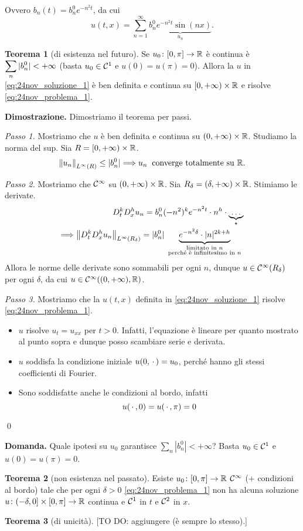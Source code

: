 Ovvero $b_n(t) = b_n^0 e^{-n^2 t}$, da cui  
\begin{equation}
\label{eq:24nov_soluzione_1} \tag{$\ast$}
	u(t,x) = \sum_{n=1}^\infty \underbrace{b_n^0 e^{-n^2t} \sin(nx)}_{u_n}.
\end{equation}


\textbf{Teorema 1} (di esistenza nel futuro).
Se $u_0 \colon [0,\pi] \to \mathbb R$ è continua è $\displaystyle \sum_n |b_n^0| < +\infty$ (basta $u_0 \in \mathcal{C}^1$ e $u(0) = u(\pi) = 0$).
Allora la $u$ in \eqref{eq:24nov_soluzione_1} è ben definita e continua su $[0,+\infty) \times \mathbb R$ e risolve \eqref{eq:24nov_problema_1}.

\textbf{Dimostrazione.} Dimostriamo il teorema per passi.

\textit{Passo 1.}
Mostriamo che $u$ è ben definita e continua su $(0,+\infty) \times \mathbb R$.
Studiamo la norma del sup. Sia $R = [0, +\infty) \times \mathbb R$.
%
$$
	\left\lVert u_n \right\rVert_{L^\infty(R)} \leq |b_n^0| \Longrightarrow u_n \;\; \text{converge totalmente su } \mathbb R.
$$
%

\textit{Passo 2.} Mostriamo che $\mathcal{C}^\infty$ su $(0,+\infty) \times \mathbb R$.
Sia $R_\delta = (\delta, +\infty) \times \mathbb R$.
Stimiamo le derivate.
\begin{align*}
	D_t^k D_x^h u_n = b_n^0 (-n^2)^k e^{-n^2t} \cdot n^h \cdot \underbrace{\ldots}_{\star} \\
	\Longrightarrow \left\lVert D_t^k D_x^h u_n \right\rVert_{L^\infty(R_\delta)} 
	= |b_n^0| \underbrace{e^{-n^2\delta} \cdot |n|^{2k+h}}_{\substack{\text{limitato in $n$} \\ \text{ perché è infinitesimo in $n$ }}}
\end{align*}
Allora le norme delle derivate sono sommabili per ogni $n$, dunque $u \in \mathcal{C}^\infty(R_\delta)$ per ogni $\delta$, da cui $u \in \mathcal{C}^\infty( (0,+\infty),\mathbb R)$.

\textit{Passo 3.} Mostriamo che la $u(t,x)$ definita in \eqref{eq:24nov_soluzione_1} risolve \eqref{eq:24nov_problema_1}.
\begin{itemize}

	\item $u$ risolve $u_t = u_{xx}$ per $t > 0$.
	Infatti, l'equazione è lineare per quanto mostrato al punto sopra e dunque posso scambiare serie e derivata.


	\item $u$ soddisfa la condizione iniziale $u(0,\,\cdot\,) = u_0$, perché hanno gli stessi coefficienti di Fourier.


	\item Sono soddisfatte anche le condizioni al bordo, infatti
	$$
	u(\,\cdot\,,0) = u(\,\cdot\,,\pi) = 0
	$$
\end{itemize}
\qed

\textbf{Domanda.} Quale ipotesi su $u_0$ garantisce $\sum_n |b_n^0| < +\infty$? Basta $u_0 \in \mathcal{C}^1$ e $u(0) = u(\pi) = 0$.

\textbf{Teorema 2} (non esistenza nel passato).
Esiste $u_0 \colon [0,\pi] \to \mathbb R$ $\mathcal{C}^\infty$ (+ condizioni al bordo) tale che per ogni $\delta > 0$ \eqref{eq:24nov_problema_1} non ha alcuna soluzione $u \colon (-\delta,0] \times [0,\pi] \to \mathbb R$ continua e $\mathcal{C}^1$ in $t$ e $\mathcal{C}^2 $ in $x$.

\textbf{Teorema 3} (di unicità). [TO DO: aggiungere (è sempre lo stesso).]
